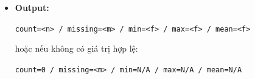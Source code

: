 \begin{itemize}
\begin{itemize}
        \item \textbf{Module 3 (Tính thống kê):}
        \begin{itemize}
            \item Hàm \texttt{computeStats(vector<double>)}
            \item Tính:
            \begin{itemize}
                \item \texttt{count}: số giá trị hợp lệ
                \item \texttt{min}: giá trị nhỏ nhất
                \item \texttt{max}: giá trị lớn nhất
                \item \texttt{mean}: trung bình cộng
            \end{itemize}
            \item Dùng \texttt{long double} để tích lũy tổng, tránh mất độ chính xác
        \end{itemize}

        \item \textbf{Module 4 (Ghi output):}
        \begin{itemize}
            \item Hàm \texttt{writeOutput(path, stats, missing)}
            \item Nếu \texttt{count = 0} $\rightarrow$ ghi \texttt{N/A} cho \texttt{min/max/mean}
            \item Nếu \texttt{count > 0} $\rightarrow$ ghi số thực với \texttt{fixed << setprecision(2)}
        \end{itemize}
    \end{itemize}

    \item \textbf{Output:}
    \begin{center}
    \texttt{count=<n> / missing=<m> / min=<f> / max=<f> / mean=<f>}
    \end{center}
    hoặc nếu không có giá trị hợp lệ:
    \begin{center}
    \texttt{count=0 / missing=<m> / min=N/A / max=N/A / mean=N/A}
    \end{center}
\end{itemize}

